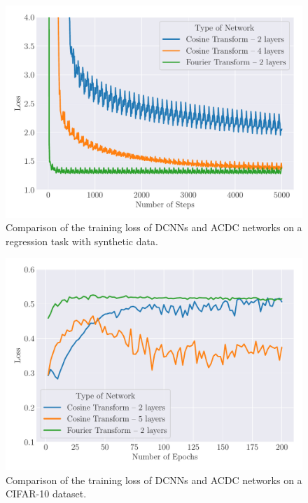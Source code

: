 \begin{figure}[ht]
   \centering
   \includegraphics[width=\scalefigure\textwidth]{figures/main/ch4-diagonal_circulant/acdc_regression.pdf}
   \caption{Comparison of the training loss of DCNNs and ACDC networks on a regression task with synthetic data.}
   \label{figure:ch4-acdc_regression}
\end{figure}

\begin{figure}[ht]
   \centering
   \includegraphics[width=\scalefigure\textwidth]{figures/main/ch4-diagonal_circulant/acdc_cifar10.pdf}
   \caption{Comparison of the training loss of DCNNs and ACDC networks on a CIFAR-10 dataset.}
   \label{figure:ch4-acdc_cifar10}
\end{figure}



